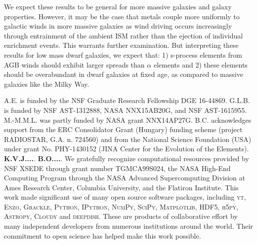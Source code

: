 \documentclass[twocolumn]{aastex61}
\begin{document}
We expect these results to be general for more massive galaxies and galaxy properties. However, it may be the case that metals couple more uniformly to galactic winds in more massive galaxies as wind driving occurs increasingly through entrainment of the ambient ISM rather than the ejection of individual enrichment events. This warrants further examination. But interpreting these results for low mass dwarf galaxies, we expect that: 1) s-process elements from AGB winds should exhibit larger spreads than $\alpha$ elements and 2) these elements should be overabundant in dwarf galaxies at fixed age, as compared to massive galaxies like the Milky Way.




\acknowledgments
A.E. is funded by the NSF Graduate Research Fellowship DGE 16-44869. G.L.B. is funded by NSF AST-1312888, NASA NNX15AB20G, and NSF AST-1615955. M.-M.M.L. was partly funded by NASA  grant NNX14AP27G. B.C. acknowledges support from the ERC Consolidator Grant (Hungary) funding scheme (project RADIOSTAR, G.A. n. 724560) and from the National Science Foundation (USA) under grant No. PHY-1430152 (JINA Center for the Evolution of the Elements). \textbf{K.V.J....}. \textbf{B.O....}. We gratefully recognize computational resources provided by NSF XSEDE through grant number TGMCA99S024, the NASA High-End Computing Program through the NASA Advanced Supercomputing Division at Ames Research Center, Columbia University, and the Flatiron Institute. This work made significant use of many open source software packages, including \textsc{yt}, \textsc{Enzo}, \textsc{Grackle}, \textsc{Python}, \textsc{IPython}, \textsc{NumPy}, \textsc{SciPy}, \textsc{Matplotlib}, \textsc{HDF5}, \textsc{h5py}, \textsc{Astropy}, \textsc{Cloudy} and \textsc{deepdish}. These are products of collaborative effort by many independent developers from numerous institutions around the world. Their commitment to open science has helped make this work possible. 

\end{document}
